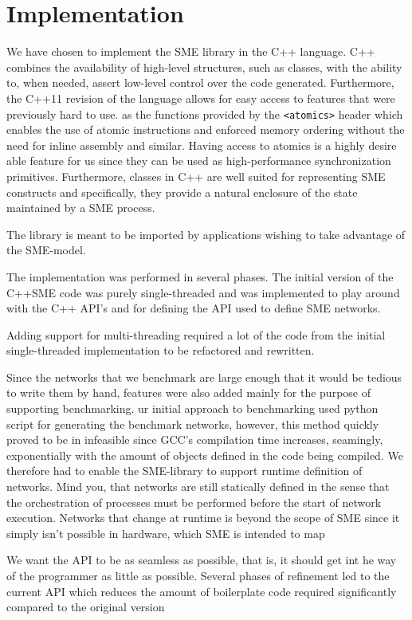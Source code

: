 \chapter{Implementation}

We have chosen to implement the SME library in the C++ language. C++
combines the availability of high-level structures, such as classes,
with the ability to, when needed, assert low-level control over the
code generated. Furthermore, the C++11 revision of the language allows
for easy access to features that were previously hard to use. as the
functions provided by the \texttt{<atomics>} header which enables the
use of atomic instructions and enforced memory ordering without the
need for inline assembly and similar. Having access to atomics is a
highly desire able feature for us since they can be used as
high-performance synchronization primitives. Furthermore, classes in
C++ are well suited for representing SME constructs and specifically,
they provide a natural enclosure of the state maintained by a SME
process.

The library is meant to be imported by applications wishing to take
advantage of the SME-model.

The implementation was performed in several phases. The initial
version of the C++SME code was purely single-threaded and was
implemented to play around with the C++ API's and for defining the
API used to define SME networks.

Adding support for multi-threading required a lot of the code from the
initial single-threaded implementation to be refactored and rewritten.

Since the networks that we benchmark are large enough that it would be
tedious to write them by hand, features were also added mainly for the
purpose of supporting benchmarking.  ur initial approach to
benchmarking used python script for generating the benchmark networks,
however, this method quickly proved to be in infeasible since GCC's
compilation time increases, seamingly, exponentially with the amount
of objects defined in the code being compiled. We therefore had to
enable the SME-library to support runtime definition of networks. Mind
you, that networks are still statically defined in the sense that the
orchestration of processes must be performed before the start of
network execution. Networks that change at runtime is beyond the scope
of SME since it simply isn't possible in hardware, which SME is
intended to map 

We want the API to be as seamless as possible, that is, it should get
int he way of the programmer as little as possible. Several phases of
refinement led to the current API which reduces the amount of
boilerplate code required  significantly compared to the original version

